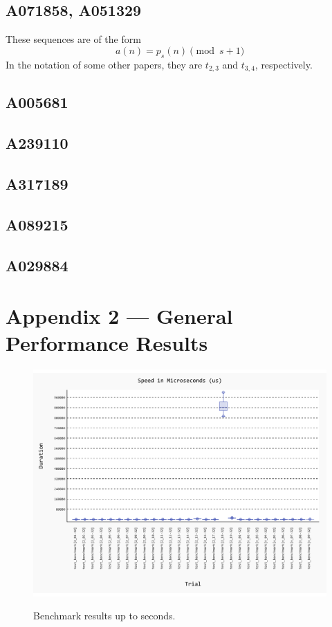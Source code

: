 \documentclass[conference]{IEEEtran}
\begin{document}
\subsection{A071858, A051329}

These sequences \cite{OEIS-A071858, OEIS-A051329} are of the form 
\begin{equation}
a(n) = p_s(n) \pmod{s + 1}
\end{equation}
In the notation of some other papers, they are $t_{2,3}$ and $t_{3,4}$, respectively.

\subsection{A005681}

\subsection{A239110}

\subsection{A317189}

\subsection{A089215}

\subsection{A029884}

\section{Appendix 2 --- General Performance Results}

\begin{figure}[H]
    \centering
    \vspace{-20pt}
    \caption{Benchmark results up to seconds.}
    \includegraphics[width=\linewidth, trim=0 0 0 0, clip]{figures/benchmark/20241204_182753.pdf}
    \label{fig:benchmark_in_s}
    \vspace{-25pt}
\end{figure}
\end{document}
